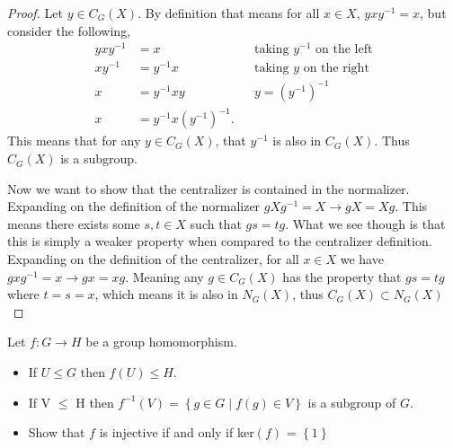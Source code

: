 \documentclass[10pt]{article}
\newenvironment{problem}[2][Problem\!]{\begin{trivlist}
\item[\hskip \labelsep {\bfseries #1}\hskip \labelsep {\bfseries #2.}]}{\end{trivlist}}
\newcommand{\set}[1]{\left\{#1\right\}} %
\renewcommand{\leq}{\leqslant}
\begin{document}
\begin{proof}
    Let $y \in C_G(X)$. By definition that means for all $x\in X$, $yxy^{-1} = x$, but consider the following,
    \begin{align*}
        yxy^{-1} &= x && \text{taking $y^{-1}$ on the left} \\
        xy^{-1} &= y^{-1}x && \text{taking $y$ on the right} \\
        x &= y^{-1}xy && y = (y^{-1})^{-1} \\
        x &= y^{-1}x(y^{-1})^{-1}.  
    \end{align*}
    This means that for any $y\in C_G(X)$, that $y^{-1}$ is also in $C_G(X)$. Thus $C_G(X)$ is a subgroup. 
    
    Now we want to show that the centralizer is contained in the normalizer. Expanding on the definition of the normalizer $gXg^{-1} = X \rightarrow gX = Xg$. This means there exists some $s,t\in X$ such that $gs = tg$. What we see though is that this is simply a weaker property when compared to the centralizer definition. Expanding on the definition of the centralizer, for all $x\in X$ we have $gxg^{-1} = x \rightarrow gx = xg$. Meaning any $g\in C_G(X)$ has the property that $gs = tg$ where $t = s = x$, which means it is also in $N_G(X)$, thus $C_G(X) \subset N_G(X)$
\end{proof}

\begin{tcolorbox}
    \begin{problem}{2.7}
        Let $f:G\rightarrow H$ be a group homomorphism. 
        \begin{itemize}
            \item[(a)] If $U \leq G$ then $f(U)\leq H$.
            \item[(b)] If V $\leq$ H then $f^{-1}(V) = \set{g\in G \mid f(g) \in V}$ is a subgroup of $G$.
            \item[(c)] Show that $f$ is injective if and only if ker$(f)$ = $\set{1}$ 
        \end{itemize}
    \end{problem}
\end{tcolorbox}
\end{document}
